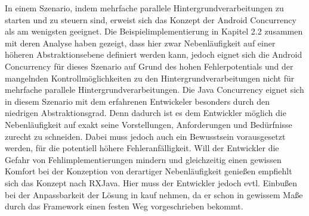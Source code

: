 \documentclass[12pt,oneside,a4paper,bibtotoc,liststotoc]{scrreprt}
\begin{document}
In einem Szenario, indem mehrfache parallele Hintergrundverarbeitungen zu starten und zu steuern sind, erweist sich das Konzept der Android Concurrency als am wenigsten geeignet. Die Beispielimplementierung in Kapitel 2.2 zusammen mit deren Analyse haben gezeigt, dass hier zwar Nebenläufigkeit auf einer höheren Abstraktionsebene definiert werden kann, jedoch eignet sich die Android Concurrency für dieses Szenario auf Grund des hohen Fehlerpotentials und der mangelnden Kontrollmöglichkeiten zu den Hintergrundverarbeitungen nicht für mehrfache parallele Hintergrundverarbeitungen. Die Java Concurrency eignet sich in diesem Szenario mit dem erfahrenen Entwickeler besonders durch den niedrigen Abstraktionsgrad. Denn dadurch ist es dem Entwickler möglich die Nebenläufigkeit auf exakt seine Vorstellungen, Anforderungen und Bedürfnisse zurecht zu schneiden. Dabei muss jedoch auch ein Bewusstsein vorausgesetzt werden, für die potentiell höhere Fehleranfälligkeit. Will der Entwickler die Gefahr von Fehlimplementierungen mindern und gleichzeitig einen gewissen Komfort bei der Konzeption von derartiger Nebenläufigkeit genießen empfiehlt sich das Konzept nach RXJava. Hier muss der Entwickler jedoch evtl. Einbußen bei der Anpassbarkeit der Lösung in kauf nehmen, da er schon in gewissem Maße durch das Framework einen festen Weg vorgeschrieben bekommt.
\end{document}
